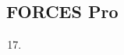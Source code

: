 \documentclass[11pt]{article}
\begin{document}
\begin{enumerate}
    \setcounter{enumi}{14}
    \item

    \item
    \end{figure}
\end{enumerate}



\subsection*{FORCES Pro} %
\label{sub:forces_pro}

\begin{enumerate}
    \setcounter{enumi}{16}
    \item
\end{enumerate}

\end{document}
